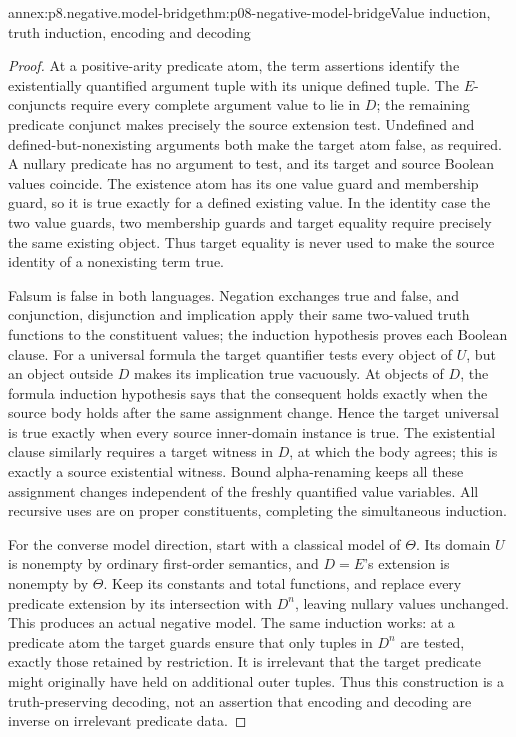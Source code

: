 \begin{annexitem}{annex:p8.negative.model-bridge}{thm:p08-negative-model-bridge}{Value induction, truth induction, encoding and decoding}
\begin{proof}
At a positive-arity predicate atom, the term assertions identify the
existentially quantified argument tuple with its unique defined tuple.
The \(E\)-conjuncts require every complete argument value to lie in
\(D\); the remaining predicate conjunct makes precisely the source
extension test.  Undefined and defined-but-nonexisting arguments both
make the target atom false, as required.  A nullary predicate has no
argument to test, and its target and source Boolean values coincide.
The existence atom has its one value guard and membership guard, so it
is true exactly for a defined existing value.  In the identity case the
two value guards, two membership guards and target equality require
precisely the same existing object.  Thus target equality is never used
to make the source identity of a nonexisting term true.

Falsum is false in both languages.  Negation exchanges true and false,
and conjunction, disjunction and implication apply their same two-valued
truth functions to the constituent values; the induction hypothesis
proves each Boolean clause.  For a universal formula the target
quantifier tests every object of \(U\), but an object outside \(D\)
makes its implication true vacuously.  At objects of \(D\), the formula
induction hypothesis says that the consequent holds exactly when the
source body holds after the same assignment change.  Hence the target
universal is true exactly when every source inner-domain instance is
true.  The existential clause similarly requires a target witness in
\(D\), at which the body agrees; this is exactly a source existential
witness.  Bound alpha-renaming keeps all these assignment changes
independent of the freshly quantified value variables.  All recursive
uses are on proper constituents, completing the simultaneous induction.

For the converse model direction, start with a classical model of
\(\Theta\).  Its domain \(U\) is nonempty by ordinary first-order
semantics, and \(D=E\)'s extension is nonempty by \(\Theta\).
Keep its constants and total functions, and replace every predicate
extension by its intersection with \(D^n\), leaving nullary values
unchanged.  This produces an actual negative model.  The same induction
works: at a predicate atom the target guards ensure that only tuples
in \(D^n\) are tested, exactly those retained by restriction.  It is
irrelevant that the target predicate might originally have held on
additional outer tuples.  Thus this construction is a truth-preserving
decoding, not an assertion that encoding and decoding are inverse on
irrelevant predicate data.


\end{proof}
\end{annexitem}
